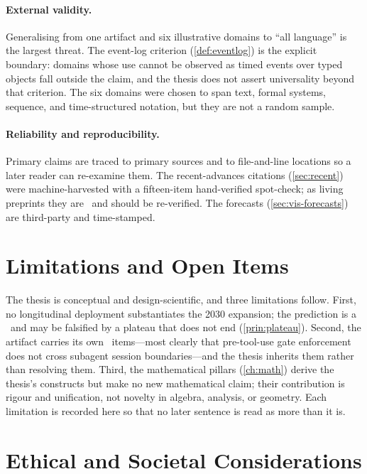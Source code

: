\paragraph{External validity.} Generalising from one artifact and six illustrative
domains to ``all language'' is the largest threat. The event-log criterion
(\cref{def:eventlog}) is the explicit boundary: domains whose use cannot be observed
as timed events over typed objects fall outside the claim, and the thesis does not
assert universality beyond that criterion. The six domains were chosen to span text,
formal systems, sequence, and time-structured notation, but they are not a random
sample.

\paragraph{Reliability and reproducibility.} Primary claims are traced to primary
sources and to file-and-line locations so a later reader can re-examine them. The
recent-advances citations (\cref{sec:recent}) were machine-harvested with a
fifteen-item hand-verified spot-check; as living preprints they are \candidate\ and
should be re-verified. The forecasts (\cref{sec:vis-forecasts}) are third-party and
time-stamped.

\section{Limitations and Open Items}
\label{sec:disc-limits}

The thesis is conceptual and design-scientific, and three limitations follow.
First, no longitudinal deployment substantiates the 2030 expansion; the prediction
is a \forecast\ and may be falsified by a plateau that does not end
(\cref{prin:plateau}). Second, the artifact carries its own \openstat\ items---most
clearly that pre-tool-use gate enforcement does not cross subagent session
boundaries---and the thesis inherits them rather than resolving them. Third, the
mathematical pillars (\cref{ch:math}) derive the thesis's constructs but make no new
mathematical claim; their contribution is rigour and unification, not novelty in
algebra, analysis, or geometry. Each limitation is recorded here so that no later
sentence is read as more than it is.

\section{Ethical and Societal Considerations}
\label{sec:disc-ethics}

